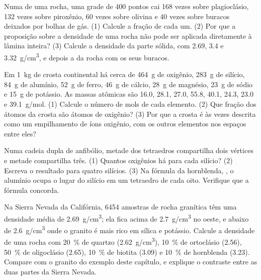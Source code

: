 \begin{exercise}[$\star\star$]\label{exo:g11:minerals:11}
Numa  de uma rocha, uma grade de 400 pontos cai 168 vezes
sobre plagioclásio, 132 vezes sobre piroxênio, 60 vezes sobre olivina e 40
vezes sobre buracos deixados por bolhas de gás. (1) Calcule a fração de
cada um. (2) Por que a proposição sobre a densidade de uma rocha não pode
ser aplicada diretamente à lâmina inteira? (3) Calcule a densidade da parte
sólida, com \qty{2.69}{},
\qty{3.4}{} e \qty{3.32}{g/cm^3}, e depois a da rocha com os seus buracos.
\end{exercise}

\begin{exercise}[$\star\star\star$]\label{exo:g11:minerals:12}
Em \qty{1}{kg} de crosta continental há cerca de \qty{464}{g} de oxigênio,
\qty{283}{g} de silício, \qty{84}{g} de alumínio, \qty{52}{g} de ferro,
\qty{46}{g} de cálcio, \qty{28}{g} de magnésio, \qty{23}{g} de sódio e
\qty{15}{g} de potássio. As massas atômicas são \qty{16.0}{}, \qty{28.1}{},
\qty{27.0}{}, \qty{55.8}{}, \qty{40.1}{}, \qty{24.3}{}, \qty{23.0}{} e
\qty{39.1}{g/mol}. (1) Calcule o número de mols de cada elemento. (2) Que
fração dos átomos da crosta são átomos de oxigênio? (3) Por que a crosta é
às vezes descrita como um empilhamento de íons oxigênio, com os outros
elementos nos espaços entre eles?
\end{exercise}

\begin{exercise}[$\star\star\star$]\label{exo:g11:minerals:13}
Numa cadeia dupla de anfibólio, metade dos tetraedros compartilha dois
vértices e metade compartilha três. (1) Quantos oxigênios há para cada
silício? (2) Escreva o resultado para quatro silícios. (3) Na fórmula da
hornblenda, , o alumínio ocupa o lugar do
silício em um tetraedro de cada oito. Verifique que a fórmula concorda.
\end{exercise}

\begin{exercise}[$\star\star\star$]\label{exo:g11:minerals:14}
Na Sierra Nevada da Califórnia, \num{6454} amostras de rocha granítica têm
uma densidade média de \qty{2.69}{g/cm^3}; ela fica acima de
\qty{2.7}{g/cm^3} no oeste, e abaixo de \qty{2.6}{g/cm^3} onde o granito é
mais rico em sílica e potássio. Calcule a densidade de uma rocha com
\qty{20}{\percent} de quartzo (\qty{2.62}{g/cm^3}), \qty{10}{\percent} de
ortoclásio (\qty{2.56}{}), \qty{50}{\percent} de oligoclásio (\qty{2.65}{}),
\qty{10}{\percent} de biotita (\qty{3.09}{}) e \qty{10}{\percent} de
hornblenda (\qty{3.23}{}). Compare com o granito do exemplo deste capítulo,
e explique o contraste entre as duas partes da Sierra Nevada.
\end{exercise}


